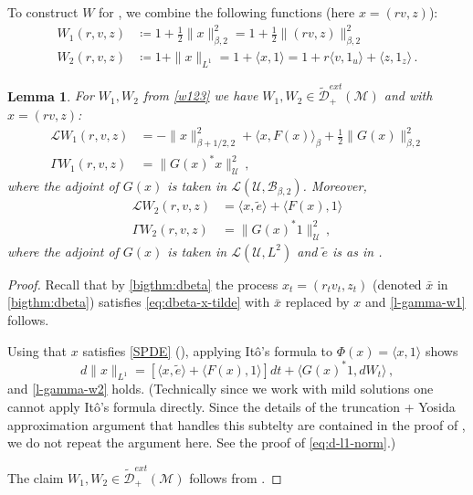 \documentclass[final]{amsart}
\newtheorem{lem}[thm]{Lemma}
\numberwithin{thm}{section}
\numberwithin{equation}{section}
\newcommand{\U}{\mathcal{U}}
\newcommand{\mcM}{\mathcal{M}}
\newcommand{\tDme}{\tilde{\mathcal{D}}^{ext}}
\newcommand{\Ll}{\mathcal{L}}
\newcommand{\ip}[2]{\langle #1, #2 \rangle}
\newcommand{\B}{\mathcal{B}}
\begin{document}
To construct $W$ for , we combine the following functions (here $x = (rv, z)$):
\begin{equation}\label{w123}
\begin{aligned}
    W_1(r,v,z) &\coloneqq 1+\frac{1}{2}\|x\|_{\beta,2}^2 = 1+\frac{1}{2}\|(rv,z)\|_{\beta,2}^2 \\
    W_2(r,v,z) &\coloneqq 1+\|x\|_{L^1} = 1+\ip{x}{1} = 1+r\ip{v}{1_u} + \ip{z}{1_z} \,.
\end{aligned}
\end{equation}


\begin{lem}\label{rigorous-w123}
    For $W_1, W_2$ from \eqref{w123} we have $W_1,W_2 \in \tDme_+(\mcM)$ and with $x = (rv, z)$:
    \begin{equation}\label{l-gamma-w1}
    \begin{aligned}
        \Ll W_1(r,v,z) &= -\|x\|_{\beta+1/2,2}^2 +\ip{x}{F(x)}_\beta + \frac{1}{2}\|G(x)\|_{\beta,2}^2 \\
        \Gamma W_1(r,v,z) &= \|G(x)^*x\|_\U^2 \,,
    \end{aligned}
\end{equation}
where the adjoint of $G(x)$ is taken in $\Ll(\U,\B_{\beta,2})$. Moreover, 
\begin{equation}\label{l-gamma-w2}
    \begin{aligned}
        \Ll W_2(r,v,z) &= \ip{x}{\tilde e} + \ip{F(x)}{1} \\
        \Gamma W_2(r,v,z) &= \|G(x)^*1\|_\U^2 \,,
    \end{aligned}
\end{equation}
where the adjoint of $G(x)$ is taken in $\Ll(\U,L^2)$ and $\tilde{e}$ is as in .
\end{lem}

\begin{proof}
    Recall that by \ref{bigthm:dbeta} the process 
    $x_t = (r_tv_t, z_t)$ (denoted $\bar{x}$ in \ref{bigthm:dbeta}) satisfies \eqref{eq:dbeta-x-tilde} with $\bar{x}$ replaced by $x$ and \eqref{l-gamma-w1} follows.
    
Using that $x$ satisfies \eqref{SPDE} (), applying It\^{o}'s formula to $\Phi(x) = \ip{x}{1}$ shows
    $$d\|x\|_{L^1} = [\ip{x}{\tilde e} + \ip{F(x)}{1}]dt + \ip{G(x)^*1}{dW_t} \,,$$
    and \eqref{l-gamma-w2} holds. (Technically since we work with mild solutions one cannot apply It\^{o}'s formula directly. Since the details of the truncation + Yosida approximation argument that handles this subtelty are contained in the proof of , we do not repeat the argument here. See the proof of \eqref{eq:d-l1-norm}.)
    
    
    The claim $W_1,W_2 \in \tDme_+(\mcM)$ follows from .
\end{proof}
\end{document}
